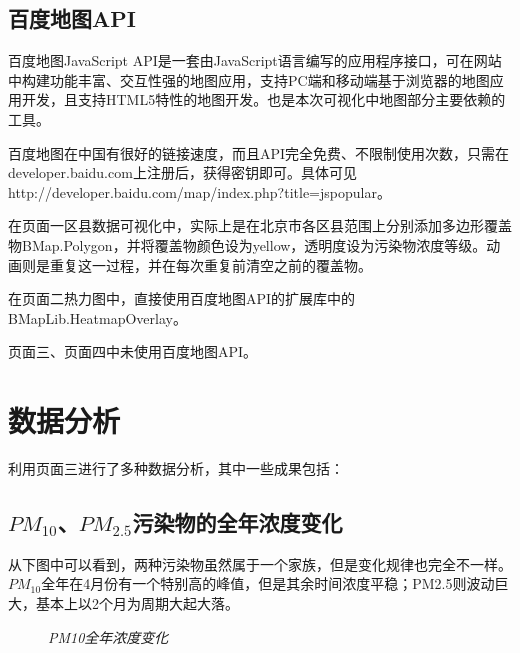 ﻿\documentclass{article}
\begin{document}
\begin{CJK*}{GBK}{song}
\subsection{百度地图API}
\qquad 百度地图JavaScript API是一套由JavaScript语言编写的应用程序接口，可在网站中构建功能丰富、交互性强的地图应用，支持PC端和移动端基于浏览器的地图应用开发，且支持HTML5特性的地图开发。也是本次可视化中地图部分主要依赖的工具。

百度地图在中国有很好的链接速度，而且API完全免费、不限制使用次数，只需在developer.baidu.com上注册后，获得密钥即可。具体可见http://developer.baidu.com/map/index.php?title=jspopular。

在页面一区县数据可视化中，实际上是在北京市各区县范围上分别添加多边形覆盖物BMap.Polygon，并将覆盖物颜色设为yellow，透明度设为污染物浓度等级。动画则是重复这一过程，并在每次重复前清空之前的覆盖物。

在页面二热力图中，直接使用百度地图API的扩展库中的BMapLib.HeatmapOverlay。

页面三、页面四中未使用百度地图API。



\section{数据分析}
\qquad 利用页面三进行了多种数据分析，其中一些成果包括：

\subsection{$PM_{10}$、$PM_{2.5}$污染物的全年浓度变化}
\qquad 从下图中可以看到，两种污染物虽然属于一个家族，但是变化规律也完全不一样。$PM_{10}$全年在4月份有一个特别高的峰值，但是其余时间浓度平稳；PM2.5则波动巨大，基本上以2个月为周期大起大落。

\begin{figure}[ht]
\centering
{}
\caption{\textit{PM10全年浓度变化}}
\end{figure}


\end{CJK*}
\end{document}
